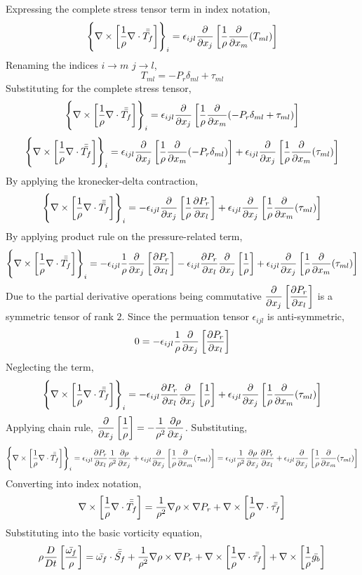 \documentclass[class=report, 12pt, crop=false]{standalone}
\begin{document}
\begin{center}
Expressing the complete stress tensor term in index notation,
$$\left\{\nabla\times\left[\frac{1}{\rho}\nabla\cdot\bar{\bar{T_f}}\right]\right\}_i = \epsilon_{ijl}\frac{\partial}{\partial x_j}\left[\frac{1}{\rho}\frac{\partial }{\partial x_m}(T_{ml})\right]$$
Renaming the indices $i\to m$ $j\to l$,
$$T_{ml} = -P_r\delta_{ml} + \tau_{ml}$$
Substituting for the complete stress tensor,
$$\left\{\nabla\times\left[\frac{1}{\rho}\nabla\cdot\bar{\bar{T_f}}\right]\right\}_i = \epsilon_{ijl}\frac{\partial}{\partial x_j}\left[\frac{1}{\rho}\frac{\partial }{\partial x_m}(-P_r\delta_{ml} + \tau_{ml})\right]$$
$$\left\{\nabla\times\left[\frac{1}{\rho}\nabla\cdot\bar{\bar{T_f}}\right]\right\}_i = \epsilon_{ijl}\frac{\partial}{\partial x_j}\left[\frac{1}{\rho}\frac{\partial }{\partial x_m}(-P_r\delta_{ml})\right] + \epsilon_{ijl}\frac{\partial}{\partial x_j}\left[\frac{1}{\rho}\frac{\partial }{\partial x_m}(\tau_{ml})\right]$$
By applying the kronecker-delta contraction,
$$\left\{\nabla\times\left[\frac{1}{\rho}\nabla\cdot\bar{\bar{T_f}}\right]\right\}_i = -\epsilon_{ijl}\frac{\partial}{\partial x_j}\left[\frac{1}{\rho}\frac{\partial P_r}{\partial x_l}\right] + \epsilon_{ijl}\frac{\partial}{\partial x_j}\left[\frac{1}{\rho}\frac{\partial }{\partial x_m}(\tau_{ml})\right]$$
By applying product rule on the pressure-related term,
$$\left\{\nabla\times\left[\frac{1}{\rho}\nabla\cdot\bar{\bar{T_f}}\right]\right\}_i = -\epsilon_{ijl}\frac{1}{\rho}\frac{\partial}{\partial x_j}\left[\frac{\partial P_r}{\partial x_l}\right]          -\epsilon_{ijl}\frac{\partial P_r}{\partial x_l}\frac{\partial}{\partial x_j}\left[\frac{1}{\rho}\right]            + \epsilon_{ijl}\frac{\partial}{\partial x_j}\left[\frac{1}{\rho}\frac{\partial }{\partial x_m}(\tau_{ml})\right]$$
Due to the partial derivative operations being commutative $\displaystyle \frac{\partial}{\partial x_j}\left[\frac{\partial P_r}{\partial x_l}\right]$ is a symmetric tensor of rank $2$. Since the permuation tensor $\epsilon_{ijl}$ is anti-symmetric,
$$0 = -\epsilon_{ijl}\frac{1}{\rho}\frac{\partial}{\partial x_j}\left[\frac{\partial P_r}{\partial x_l}\right]$$
Neglecting the term,
$$\left\{\nabla\times\left[\frac{1}{\rho}\nabla\cdot\bar{\bar{T_f}}\right]\right\}_i =          -\epsilon_{ijl}\frac{\partial P_r}{\partial x_l}\frac{\partial}{\partial x_j}\left[\frac{1}{\rho}\right]            + \epsilon_{ijl}\frac{\partial}{\partial x_j}\left[\frac{1}{\rho}\frac{\partial }{\partial x_m}(\tau_{ml})\right]$$
Applying chain rule, $\displaystyle \frac{\partial}{\partial x_j}\left[\frac{1}{\rho}\right] = -\frac{1}{\rho^2}\frac{\partial \rho}{\partial x_j}$. Substituting,
$$\left\{\nabla\times\left[\frac{1}{\rho}\nabla\cdot\bar{\bar{T_f}}\right]\right\}_i = \epsilon_{ijl}\frac{\partial P_r}{\partial x_l}\frac{1}{\rho^2}\frac{\partial \rho}{\partial x_j} + \epsilon_{ijl}\frac{\partial}{\partial x_j}\left[\frac{1}{\rho}\frac{\partial }{\partial x_m}(\tau_{ml})\right] = \epsilon_{ijl}\frac{1}{\rho^2}\frac{\partial \rho}{\partial x_j}\frac{\partial P_r}{\partial x_l} + \epsilon_{ijl}\frac{\partial}{\partial x_j}\left[\frac{1}{\rho}\frac{\partial }{\partial x_m}(\tau_{ml})\right]$$
Converting into index notation,
$$\nabla\times\left[\frac{1}{\rho}\nabla\cdot\bar{\bar{T_f}}\right] =  \frac{1}{\rho^2}\nabla\rho\times\nabla P_r + \nabla\times\left[\frac{1}{\rho}\nabla\cdot\bar{\bar{\tau_f}}\right]$$
Substituting into the basic vorticity equation,
$$\rho\frac{D}{Dt}\left[\frac{\bar{\omega_f}}{\rho}\right] = \bar{\omega_f} \cdot \bar{\bar{S_f}} + \frac{1}{\rho^2}\nabla\rho\times\nabla P_r + \nabla\times\left[\frac{1}{\rho}\nabla\cdot\bar{\bar{\tau_f}}\right] + \nabla\times\left[\frac{1}{\rho}\bar{g_b}\right]$$




\end{center}
\end{document}
